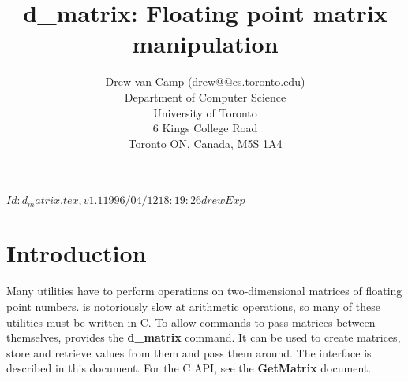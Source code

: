 \documentclass{article}
\newcommand{\dmatrix}{\textbf{d\_matrix}}
\begin{document}
\rcsInfo $Id: d_matrix.tex,v 1.1 1996/04/12 18:19:26 drew Exp $

\title{d\_matrix: Floating point matrix manipulation}
\author{Drew van Camp (drew@@cs.toronto.edu)\\[1ex]
	Department of Computer Science\\
	University of Toronto\\
	6 Kings College Road\\
	Toronto ON, Canada, M5S 1A4}

\vfil
\maketitle
\vfil
{}
\vfil
\clearpage

\section{Introduction}

Many \delve{} utilities have to perform operations on two-dimensional
matrices of floating point numbers.  \tcl{} is notoriously slow at
arithmetic operations, so many of these utilities must be written in
C.  To allow commands to pass matrices between themselves, \delve{}
provides the \dmatrix{} command.  It can be used to create matrices,
store and retrieve values from them and pass them around.  The \tcl{}
interface is described in this document.  For the C API, see the
\textbf{GetMatrix} document.
\end{document}
